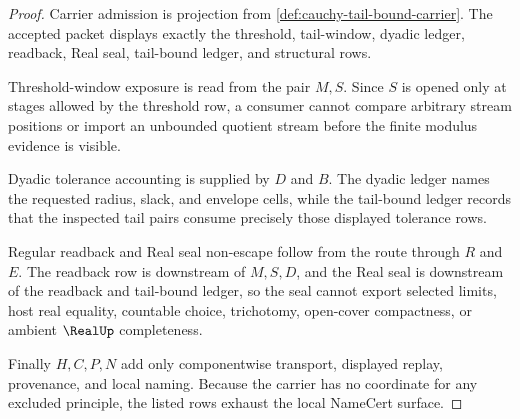 \begin{proof}
Carrier admission is projection from \autoref{def:cauchy-tail-bound-carrier}. The accepted packet displays exactly the threshold, tail-window, dyadic ledger, readback, Real seal, tail-bound ledger, and structural rows.

Threshold-window exposure is read from the pair $M,S$. Since $S$ is opened only at stages allowed by the threshold row, a consumer cannot compare arbitrary stream positions or import an unbounded quotient stream before the finite modulus evidence is visible.

Dyadic tolerance accounting is supplied by $D$ and $B$. The dyadic ledger names the requested radius, slack, and envelope cells, while the tail-bound ledger records that the inspected tail pairs consume precisely those displayed tolerance rows.

Regular readback and Real seal non-escape follow from the route through $R$ and $E$. The readback row is downstream of $M,S,D$, and the Real seal is downstream of the readback and tail-bound ledger, so the seal cannot export selected limits, host real equality, countable choice, trichotomy, open-cover compactness, or ambient $\RealUp$ completeness.

Finally $H,C,P,N$ add only componentwise transport, displayed replay, provenance, and local naming. Because the carrier has no coordinate for any excluded principle, the listed rows exhaust the local NameCert surface.
\end{proof}


